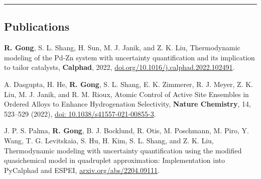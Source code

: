 \documentclass[10pt,letterpaper]{article}
\begin{document}
\hrule
\vspace{-0.6em}
\subsection*{Publications}

\begin{etaremune}
  \item \textbf{R. Gong}, S. L. Shang, H. Sun, M. J. Janik, and Z. K. Liu,
  Thermodynamic modeling of the Pd-Zn system with uncertainty quantification and its implication to tailor catalysts, 
  \textbf{Calphad}, 2022, \href{https://doi.org/10.1016/j.calphad.2022.102491}{doi.org/10.1016/j.calphad.2022.102491}.
  \item  A. Dasgupta, H. He, \textbf{R. Gong}, S. L. Shang, E. K. Zimmerer, R. J. Meyer, Z. K. Liu, M. J. Janik, and R. M. Rioux,
  Atomic Control of Active Site Ensembles in Ordered Alloys to Enhance Hydrogenation Selectivity, 
  \textbf{Nature Chemistry}, 14, 523–529 (2022), \href{https://doi.org/10.1038/s41557-021-00855-3}{doi: 10.1038/s41557-021-00855-3}.
  \item J. P. S. Palma, \textbf{R. Gong}, B. J. Bocklund, R. Otis, M. Poschmann, M. Piro, Y. Wang, T. G. Levitskaia, S. Hu, H. Kim, S. L. Shang, and Z. K. Liu, 
  Thermodynamic modeling with uncertainty quantification using the modified quasichemical model in quadruplet approximation: Implementation into PyCalphad and ESPEI,  \href{http://arxiv.org/abs/2204.09111}{arxiv.org/abs/2204.09111}.
\end{etaremune}
\end{document}
